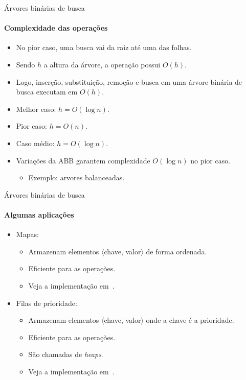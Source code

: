 \begin{frame}{Árvores binárias de busca}
\framesubtitle{Complexidade das operações}
\begin{itemize}
	\item No pior caso, uma busca vai da raiz até uma das folhas.
	\item Sendo $h$ a altura da árvore, a operação possui $O(h)$.
	\item Logo, inserção, substituição, remoção e busca em uma árvore binária de busca executam em $O(h)$.
	\item Melhor caso: $h = O(\log n)$.
	\item Pior caso: $h = O(n)$.
	\item Caso médio: $h = O(\log n)$.
	\item Variações da ABB garantem complexidade $O(\log n)$ no pior caso.
	\begin{itemize}
		\item Exemplo: arvores balanceadas.
	\end{itemize}
\end{itemize}
\end{frame}



\begin{frame}{Árvores binárias de busca}
\framesubtitle{Algumas aplicações}

\begin{itemize}
	\item Mapas:
	\begin{itemize}
		\item Armazenam elementos $\langle$chave, valor$\rangle$ de forma ordenada.
		\item Eficiente para as operações.
		\item Veja a implementação em~\cite{GoodrichEtAl2014}.
	\end{itemize}
	\bigskip
	\item Filas de prioridade:
	\begin{itemize}
		\item Armazenam elementos $\langle$chave, valor$\rangle$ onde a chave é a prioridade.
		\item Eficiente para as operações.
		\item São chamadas de \textit{heaps}.
		\item Veja a implementação em~\cite{GoodrichEtAl2014}.
	\end{itemize}
\end{itemize}
\end{frame}



